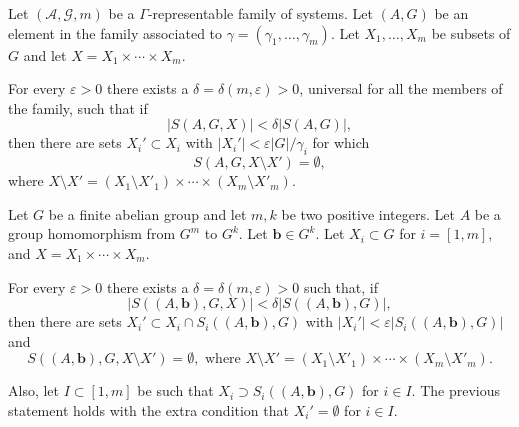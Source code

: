  \begin {theorem} 
  \label {t.rep_sys_rem_lem} Let $(\mathcal {A},\mathcal {G},m)$ be a $\Gamma $-representable family of systems. Let $(A,G)$ be an element in the family associated to $\gamma =(\gamma _1,\ldots ,\gamma _m)$. Let $X_1,\ldots ,X_m$ be subsets of $G$ and let $X=X_1\times \cdots \times X_m$. \par For every $\varepsilon >0$ there exists a $\delta =\delta (m,\varepsilon )>0$, universal for all the members of the family, such that if $$|S(A,G,X)|<\delta |S(A,G)|,$$ then there are sets $X_i'\subset X_i$ with $|X_i'|<\varepsilon |G|/ \gamma _i$ for which $$ S\left (A,G,X\setminus X'\right )=\emptyset ,$$ where $X\setminus X'=(X_1\setminus X'_1)\times \cdots \times (X_m\setminus X'_m)$. 
 \end {theorem} 
 
 \begin {theorem} 
  \label {t.rem_lem_ab_gr} Let $G$ be a finite abelian group and let $m, k$ be two positive integers. Let $A$ be a group homomorphism from $G^m$ to $G^k$. Let $\mathbf {b}\in G^k$. Let $X_i\subset G$ for $i=[1,m]$, and $X=X_1\times \cdots \times X_m$. \par For every $\varepsilon >0$ there exists a $\delta =\delta (m,\varepsilon )>0$ such that, if $$\left |S((A,\mathbf {b}),G,X)\right |<\delta \left |S((A,\mathbf {b}),G)\right |,$$ then there are sets $X_i'\subset X_i\cap S_i((A,\mathbf {b}),G)$ with $|X_i'|<\varepsilon |S_i((A,\mathbf {b}),G)|$ and $$S\left ((A,\mathbf {b}),G, X\setminus X'\right )=\emptyset , \text { where } X\setminus X'=(X_1\setminus X'_1)\times \cdots \times (X_m\setminus X'_m).$$ \par Also, let $I\subset [1,m]$ be such that $X_i\supset S_i((A,\mathbf {b}),G)$ for $i\in I$. The previous statement holds with the extra condition that $X_i'=\emptyset $ for $i\in I$. 
 \end {theorem} 
 
